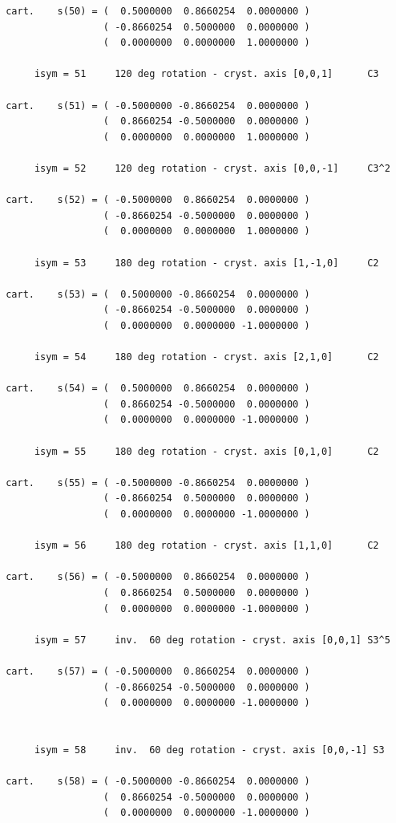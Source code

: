 \documentclass[12pt,a4paper]{article}
\begin{document}
\begin{verbatim}
 cart.    s(50) = (  0.5000000  0.8660254  0.0000000 )
                  ( -0.8660254  0.5000000  0.0000000 )
                  (  0.0000000  0.0000000  1.0000000 )

      isym = 51     120 deg rotation - cryst. axis [0,0,1]      C3

 cart.    s(51) = ( -0.5000000 -0.8660254  0.0000000 )
                  (  0.8660254 -0.5000000  0.0000000 )
                  (  0.0000000  0.0000000  1.0000000 )

      isym = 52     120 deg rotation - cryst. axis [0,0,-1]     C3^2

 cart.    s(52) = ( -0.5000000  0.8660254  0.0000000 )
                  ( -0.8660254 -0.5000000  0.0000000 )
                  (  0.0000000  0.0000000  1.0000000 )

      isym = 53     180 deg rotation - cryst. axis [1,-1,0]     C2

 cart.    s(53) = (  0.5000000 -0.8660254  0.0000000 )
                  ( -0.8660254 -0.5000000  0.0000000 )
                  (  0.0000000  0.0000000 -1.0000000 )

      isym = 54     180 deg rotation - cryst. axis [2,1,0]      C2

 cart.    s(54) = (  0.5000000  0.8660254  0.0000000 )
                  (  0.8660254 -0.5000000  0.0000000 )
                  (  0.0000000  0.0000000 -1.0000000 )

      isym = 55     180 deg rotation - cryst. axis [0,1,0]      C2

 cart.    s(55) = ( -0.5000000 -0.8660254  0.0000000 )
                  ( -0.8660254  0.5000000  0.0000000 )
                  (  0.0000000  0.0000000 -1.0000000 )

      isym = 56     180 deg rotation - cryst. axis [1,1,0]      C2

 cart.    s(56) = ( -0.5000000  0.8660254  0.0000000 )
                  (  0.8660254  0.5000000  0.0000000 )
                  (  0.0000000  0.0000000 -1.0000000 )

      isym = 57     inv.  60 deg rotation - cryst. axis [0,0,1] S3^5

 cart.    s(57) = ( -0.5000000  0.8660254  0.0000000 )
                  ( -0.8660254 -0.5000000  0.0000000 )
                  (  0.0000000  0.0000000 -1.0000000 )


      isym = 58     inv.  60 deg rotation - cryst. axis [0,0,-1] S3

 cart.    s(58) = ( -0.5000000 -0.8660254  0.0000000 )
                  (  0.8660254 -0.5000000  0.0000000 )
                  (  0.0000000  0.0000000 -1.0000000 )


\end{verbatim}
\end{document}
